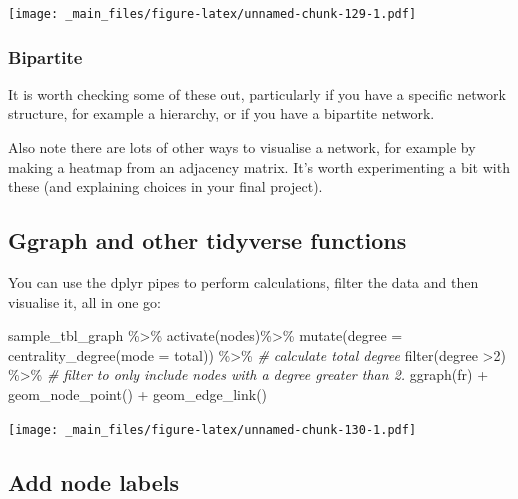 \documentclass[
]{book}
\newenvironment{Shaded}{\begin{snugshade}}{\end{snugshade}}
\newcommand{\AttributeTok}[1]{\textcolor[rgb]{0.77,0.63,0.00}{#1}}
\newcommand{\CommentTok}[1]{\textcolor[rgb]{0.56,0.35,0.01}{\textit{#1}}}
\newcommand{\DecValTok}[1]{\textcolor[rgb]{0.00,0.00,0.81}{#1}}
\newcommand{\FunctionTok}[1]{\textcolor[rgb]{0.00,0.00,0.00}{#1}}
\newcommand{\NormalTok}[1]{#1}
\newcommand{\SpecialCharTok}[1]{\textcolor[rgb]{0.00,0.00,0.00}{#1}}
\newcommand{\StringTok}[1]{\textcolor[rgb]{0.31,0.60,0.02}{#1}}
\begin{document}
\texttt{[image: \_main\_files/figure-latex/unnamed-chunk-129-1.pdf]}

\hypertarget{bipartite}{%
\subsubsection{Bipartite}\label{bipartite}}

It is worth checking some of these out, particularly if you have a specific network structure, for example a hierarchy, or if you have a bipartite network.

Also note there are lots of other ways to visualise a network, for example by making a heatmap from an adjacency matrix. It's worth experimenting a bit with these (and explaining choices in your final project).

\hypertarget{ggraph-and-other-tidyverse-functions}{%
\subsection{Ggraph and other tidyverse functions}\label{ggraph-and-other-tidyverse-functions}}

You can use the dplyr pipes to perform calculations, filter the data and then visualise it, all in one go:

\begin{Shaded}
\begin{Highlighting}[]
\NormalTok{sample\_tbl\_graph }\SpecialCharTok{\%\textgreater{}\%} 
  \FunctionTok{activate}\NormalTok{(nodes)}\SpecialCharTok{\%\textgreater{}\%} 
  \FunctionTok{mutate}\NormalTok{(}\AttributeTok{degree =} \FunctionTok{centrality\_degree}\NormalTok{(}\AttributeTok{mode =} \StringTok{\textquotesingle{}total\textquotesingle{}}\NormalTok{)) }\SpecialCharTok{\%\textgreater{}\%} \CommentTok{\# calculate total degree }
  \FunctionTok{filter}\NormalTok{(degree }\SpecialCharTok{\textgreater{}}\DecValTok{2}\NormalTok{) }\SpecialCharTok{\%\textgreater{}\%} \CommentTok{\# filter to only include nodes with a degree greater than 2.}
  \FunctionTok{ggraph}\NormalTok{(}\StringTok{\textquotesingle{}fr\textquotesingle{}}\NormalTok{) }\SpecialCharTok{+} 
  \FunctionTok{geom\_node\_point}\NormalTok{() }\SpecialCharTok{+} 
  \FunctionTok{geom\_edge\_link}\NormalTok{()}
\end{Highlighting}
\end{Shaded}

\texttt{[image: \_main\_files/figure-latex/unnamed-chunk-130-1.pdf]}

\hypertarget{add-node-labels}{%
\subsection{Add node labels}\label{add-node-labels}}
\end{document}
